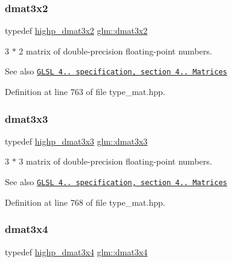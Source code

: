 \subsubsection{\texorpdfstring{dmat3x2}{dmat3x2}}
{\footnotesize\ttfamily typedef \hyperlink{group__core__precision_gac956fe6b946f0ccee78367ccd5427351}{highp\+\_\+dmat3x2} \hyperlink{group__core__types_ga2db259d2e7921065c5b7d4dca9547960}{glm\+::dmat3x2}}

3 $\ast$ 2 matrix of double-\/precision floating-\/point numbers.

\begin{DoxySeeAlso}{See also}
\href{http://www.opengl.org/registry/doc/GLSLangSpec.4.20.8.pdf}{\tt G\+L\+SL 4.. specification, section 4.. Matrices} 
\end{DoxySeeAlso}


Definition at line 763 of file type\+\_\+mat.\+hpp.

\mbox{\label{group__core__types_gaf3c29c4f75a448f308463e75ca2efd4c}} 
\subsubsection{\texorpdfstring{dmat3x3}{dmat3x3}}
{\footnotesize\ttfamily typedef \hyperlink{group__core__precision_gad7229dea82287910d88e6e8566e39fc7}{highp\+\_\+dmat3x3} \hyperlink{group__core__types_gaf3c29c4f75a448f308463e75ca2efd4c}{glm\+::dmat3x3}}

3 $\ast$ 3 matrix of double-\/precision floating-\/point numbers.

\begin{DoxySeeAlso}{See also}
\href{http://www.opengl.org/registry/doc/GLSLangSpec.4.20.8.pdf}{\tt G\+L\+SL 4.. specification, section 4.. Matrices} 
\end{DoxySeeAlso}


Definition at line 768 of file type\+\_\+mat.\+hpp.

\mbox{\label{group__core__types_ga19e745a83cba85f57afa1232276dcc96}} 
\subsubsection{\texorpdfstring{dmat3x4}{dmat3x4}}
{\footnotesize\ttfamily typedef \hyperlink{group__core__precision_gaff199c8d04a8edb92ed43283e8694c59}{highp\+\_\+dmat3x4} \hyperlink{group__core__types_ga19e745a83cba85f57afa1232276dcc96}{glm\+::dmat3x4}}

